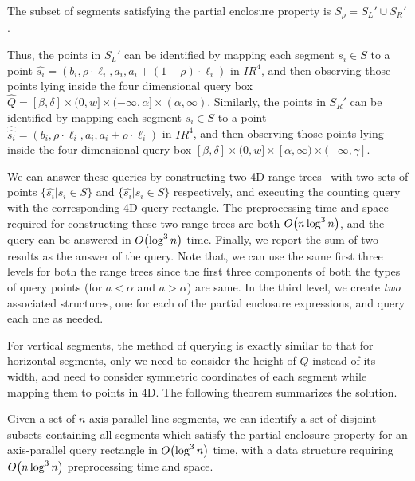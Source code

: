 \begin{observation}
The subset of segments satisfying the partial enclosure property is 
$S_\rho = S_L' \cup S_R'$. 
\end{observation}

Thus, the points in $S_L'$ can be identified by mapping each 
segment $s_i\in S$ to a point $\hat{s_i}=(b_i,\rho\cdot\ell_i,
a_i,a_i + (1-\rho) \cdot\ell_i)$ in $I\!\!R^4$, and then observing  
those points lying inside the  four dimensional query box 
$\hat{Q}=[\beta, \delta] \times (0,w] \times (-\infty,\alpha] \times 
(\alpha,\infty)$. 
Similarly, the points in $S_R'$ can be identified 
by mapping each segment $s_i\in S$ to a point 
$\hat{\hat{s_i}}=(b_i,\rho\cdot\ell_i,a_i,a_i + \rho 
\cdot\ell_i)$ in $I\!\!R^4$, and then observing  
those points lying inside the  four dimensional query box 
$[\beta, \delta] \times (0, w] \times [\alpha, \infty) 
\times (-\infty, \gamma]$.

We can answer these queries by constructing two 4D range 
trees~\cite{Deberg} with two sets of points $\{\hat{s_i}|s_i 
\in S\}$ and $\{\hat{s_i}|s_i \in S\}$ respectively, and 
executing the counting query with the corresponding 4D query 
rectangle. The preprocessing time and space required for 
constructing these two range trees are both $O\!\left(n \log^3{n}\right)$, 
and the query can be answered in $O\!\left(\log^3{n}\right)$ time. Finally, 
we report the sum of two results as the answer of the query. 
Note that, we can use the same first three levels for both the 
range trees since the first three components of both the types 
of query points (for $a<\alpha$ and $a > \alpha$) are same. In the  
third level, we create \emph{two} associated structures, one for 
each of the partial enclosure expressions, and query each one as 
needed. 

For vertical segments, the method of querying is exactly similar 
to that for horizontal segments, only we need to consider the 
height of $Q$ instead of its width, and need to consider symmetric 
coordinates of each segment while mapping them to points in 4D. 
The following theorem summarizes the solution.

\begin{theorem}
\label{th:ap}
Given a set of $n$ axis-parallel line segments, we can identify a set of disjoint subsets containing all segments which satisfy the partial enclosure property for an axis-parallel query rectangle in $O\!\left(\log^3{n}\right)$ time, with a data structure requiring $O\!\left(n\log^3{n}\right)$ preprocessing time and space.
\end{theorem}


